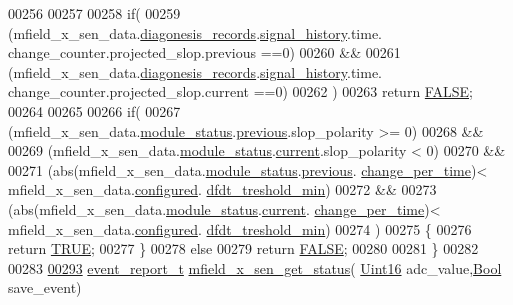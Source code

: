 \begin{DoxyCode}
00256 
00257 
00258        \textcolor{keywordflow}{if}(
00259           (mfield\_x\_sen\_data.\hyperlink{a00025_a2bd79ce84bbd6b7f50d38954f7ae475e}{diagonesis\_records}.\hyperlink{a00019_ab7038f4de1f77b52a7f89e9f77c0b846}{signal\_history}.time.
      change\_counter.projected\_slop.previous ==0)
00260                &&
00261           (mfield\_x\_sen\_data.\hyperlink{a00025_a2bd79ce84bbd6b7f50d38954f7ae475e}{diagonesis\_records}.\hyperlink{a00019_ab7038f4de1f77b52a7f89e9f77c0b846}{signal\_history}.time.
      change\_counter.projected\_slop.current  ==0)
00262           )
00263            \textcolor{keywordflow}{return} \hyperlink{a00040_aa93f0eb578d23995850d61f7d61c55c1}{FALSE};
00264 
00265 
00266        \textcolor{keywordflow}{if}(
00267        (mfield\_x\_sen\_data.\hyperlink{a00025_adfab5a5d8b45a93dfb13edb24e2b80e3}{module\_status}.\hyperlink{a00019_adcb859b2f3983a9c58deab28e59c333f}{previous}.slop\_polarity >= 0)
00268        &&
00269        (mfield\_x\_sen\_data.\hyperlink{a00025_adfab5a5d8b45a93dfb13edb24e2b80e3}{module\_status}.\hyperlink{a00019_acf41ffc11da291c2f9f0fcb02ee72b98}{current}.slop\_polarity < 0)
00270        &&
00271        (abs(mfield\_x\_sen\_data.\hyperlink{a00025_adfab5a5d8b45a93dfb13edb24e2b80e3}{module\_status}.\hyperlink{a00019_adcb859b2f3983a9c58deab28e59c333f}{previous}.
      \hyperlink{a00019_a0f645dd76b41adc6a966feba8e4bff8c}{change\_per\_time})< mfield\_x\_sen\_data.\hyperlink{a00025_a94b2d1f6ea4ab334c74d24984dd27843}{configured}.
      \hyperlink{a00021_a6f5257920e763b7f5f440bc0515cd963}{dfdt\_treshold\_min})
00272        &&
00273        (abs(mfield\_x\_sen\_data.\hyperlink{a00025_adfab5a5d8b45a93dfb13edb24e2b80e3}{module\_status}.\hyperlink{a00019_acf41ffc11da291c2f9f0fcb02ee72b98}{current}.
      \hyperlink{a00019_a0f645dd76b41adc6a966feba8e4bff8c}{change\_per\_time})< mfield\_x\_sen\_data.\hyperlink{a00025_a94b2d1f6ea4ab334c74d24984dd27843}{configured}.
      \hyperlink{a00021_a6f5257920e763b7f5f440bc0515cd963}{dfdt\_treshold\_min})
00274        )
00275        \{
00276         \textcolor{keywordflow}{return} \hyperlink{a00040_aa8cecfc5c5c054d2875c03e77b7be15d}{TRUE};
00277        \}
00278         \textcolor{keywordflow}{else}
00279         \textcolor{keywordflow}{return} \hyperlink{a00040_aa93f0eb578d23995850d61f7d61c55c1}{FALSE};
00280 
00281 \}
00282 
00283 
\hypertarget{a00052_source_l00293}{}\hyperlink{a00052_a3a46d0e69b27b3566e6d8465cf7a8b0a}{00293} \hyperlink{a00021_d6/d66/a00441}{event\_report\_t} \hyperlink{a00052_a3a46d0e69b27b3566e6d8465cf7a8b0a}{mfield\_x\_sen\_get\_status}(
      \hyperlink{a00072_a59a9f6be4562c327cbfb4f7e8e18f08b}{Uint16} adc\_value,\hyperlink{a00072_a253b248072cfc8bd812c69acd0046eed}{Bool} save\_event)

\end{DoxyCode}
